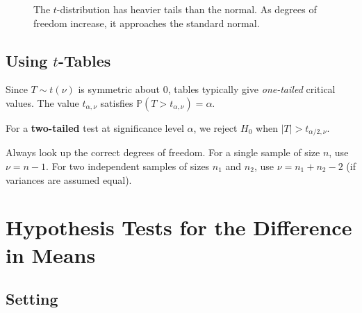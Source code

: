 \documentclass[12pt, a4paper, oneside]{book}
\theoremstyle{definition}
\theoremstyle{plain}
\theoremstyle{remark}
\newcommand{\Prob}{\mathbb{P}}
\begin{document}
\begin{figure}[h]
\centering
{}
\caption{The $t$-distribution has heavier tails than the normal.  As
  degrees of freedom increase, it approaches the standard normal.}
\label{fig:tdist}
\end{figure}

\subsection{Using $t$-Tables}

Since $T\sim t(\nu)$ is symmetric about 0, tables typically give
\emph{one-tailed} critical values.  The value $t_{\alpha,\nu}$ satisfies
$\Prob(T > t_{\alpha,\nu}) = \alpha$.

For a \textbf{two-tailed} test at significance level $\alpha$, we reject
$H_0$ when $|T| > t_{\alpha/2,\nu}$.

\begin{examtrap}
Always look up the correct degrees of freedom.  For a single sample of
size $n$, use $\nu = n-1$.  For two independent samples of sizes $n_1$
and $n_2$, use $\nu = n_1+n_2-2$ (if variances are assumed equal).
\end{examtrap}

\section{Hypothesis Tests for the Difference in Means}
\label{sec:twosample}

\subsection{Setting}
\end{document}

